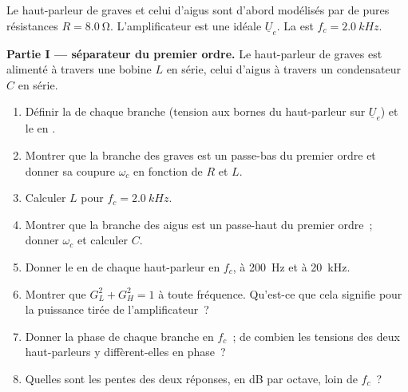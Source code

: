 \begin{problem}
\label{pb:b1:filters-transfer-functions:1}
Le haut-parleur de graves et celui d'aigus sont d'abord modélisés par
de pures résistances $R = \qty{8.0}{\ohm}$. L'amplificateur est une
 idéale $\underline U_e$. La  est
$f_c = \qty{2.0}{kHz}$.

\medskip
\noindent\textbf{Partie I ---  séparateur du premier ordre.}
Le haut-parleur de graves est alimenté à travers une bobine $L$ en
série, celui d'aigus à travers un condensateur $C$ en série.
\begin{enumerate}
  \item Définir la  de chaque branche (tension aux
        bornes du haut-parleur sur $\underline U_e$) et le  en
        .
  \item Montrer que la branche des graves est un passe-bas du premier
        ordre et donner sa coupure $\omega_c$ en fonction de $R$ et $L$.
  \item Calculer $L$ pour $f_c = \qty{2.0}{kHz}$.
  \item Montrer que la branche des aigus est un passe-haut du premier
        ordre~; donner $\omega_c$ et calculer $C$.
  \item Donner le  en  de chaque haut-parleur en $f_c$, à
        \qty{200}{Hz} et à \qty{20}{kHz}.
  \item Montrer que $G_L^2 + G_H^2 = 1$ à toute fréquence. Qu'est-ce que
        cela signifie pour la puissance tirée de l'amplificateur~?
  \item Donner la phase de chaque branche en $f_c$~; de combien les
        tensions des deux haut-parleurs y diffèrent-elles en phase~?
  \item Quelles sont les pentes des deux réponses, en dB par octave,
        loin de $f_c$~?
\end{enumerate}


\end{problem}
